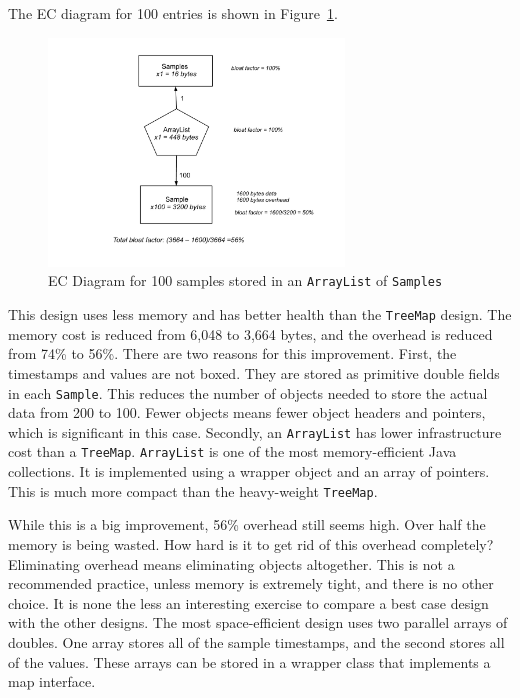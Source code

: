The EC diagram for 100 entries is shown in Figure~\ref{fig:content-schematic-arraylist-pairs}.
\begin{figure}
  \centering
 \includegraphics[width=0.7\textwidth]{part1/Figures/memoryhealth/arraylist-doubles}
  \caption{EC Diagram for 100 samples stored in an \texttt{ArrayList} of \texttt{Samples}}
  \label{fig:content-schematic-arraylist-pairs}
\end{figure} 
This design uses less memory and has better health than the \texttt{TreeMap} design. The memory cost is reduced from 6,048 to 3,664 bytes, and the overhead is reduced from 74\% to 56\%.  There are two reasons for this improvement. First, the timestamps and values are not boxed. They are stored as primitive double fields in each \texttt{Sample}. This reduces the number of objects needed to store the actual data from 200 to 100. Fewer objects means fewer object headers and pointers, which is significant in this case. Secondly, an \texttt{ArrayList} has lower infrastructure cost than a \texttt{TreeMap}. \texttt{ArrayList} is one of the most memory-efficient Java collections. It is implemented using a wrapper object and an array of pointers. This is much more compact than the heavy-weight \texttt{TreeMap}. 

While this is a big improvement, 56\% overhead still seems high. Over half the memory is being wasted. How hard is it to get rid of this overhead completely? Eliminating overhead means eliminating objects altogether. This is not a recommended practice, unless memory is extremely tight, and there is no other choice. It is none the less an interesting exercise to compare a best case design with the other designs. The most space-efficient design uses two parallel arrays of doubles. One array stores all of the sample timestamps, and the second stores all of the values. These arrays can be stored in a wrapper class that implements a map interface.

